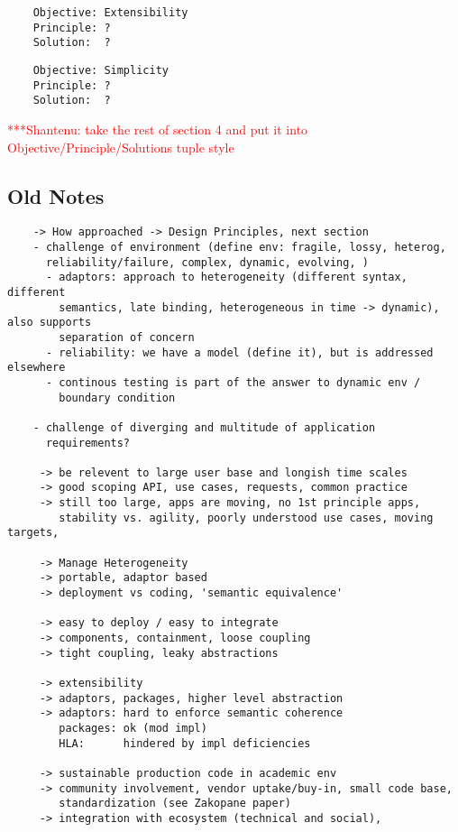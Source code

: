 \documentclass[a4paper,10pt]{article}
\newcommand{\jhanote}[1]{  {\textcolor{red}  { ***Shantenu: #1 }}}
\newcommand{\jhanote}[1]{}
\begin{document}
  \begin{verbatim}
    Objective: Extensibility
    Principle: ?
    Solution:  ?
   \end{verbatim}

  \begin{verbatim}
    Objective: Simplicity
    Principle: ?
    Solution:  ?
 \end{verbatim}


 \jhanote{take the rest of section 4 and put it into
   Objective/Principle/Solutions tuple style}

 \subsection{Old Notes}

\begin{verbatim}
    -> How approached -> Design Principles, next section
    - challenge of environment (define env: fragile, lossy, heterog,
      reliability/failure, complex, dynamic, evolving, ) 
      - adaptors: approach to heterogeneity (different syntax, different
        semantics, late binding, heterogeneous in time -> dynamic), also supports 
        separation of concern
      - reliability: we have a model (define it), but is addressed elsewhere
      - continous testing is part of the answer to dynamic env /
        boundary condition

    - challenge of diverging and multitude of application
      requirements?

     -> be relevent to large user base and longish time scales
     -> good scoping API, use cases, requests, common practice
     -> still too large, apps are moving, no 1st principle apps,
        stability vs. agility, poorly understood use cases, moving targets, 

     -> Manage Heterogeneity
     -> portable, adaptor based
     -> deployment vs coding, 'semantic equivalence'
  
     -> easy to deploy / easy to integrate
     -> components, containment, loose coupling
     -> tight coupling, leaky abstractions
  
     -> extensibility
     -> adaptors, packages, higher level abstraction
     -> adaptors: hard to enforce semantic coherence
        packages: ok (mod impl)
        HLA:      hindered by impl deficiencies
  
     -> sustainable production code in academic env
     -> community involvement, vendor uptake/buy-in, small code base,
        standardization (see Zakopane paper)
     -> integration with ecosystem (technical and social), 
   \end{verbatim}
\end{document}
